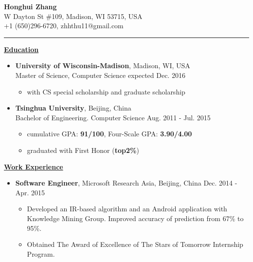 \documentclass[11pt]{article}
\begin{document}
\begin{CJK}{GBK}{kai}
\begin{center}
  {\textbf{\huge Honghui Zhang}}\\ W Dayton St \#109, Madison, WI 53715, USA\\
  +1 (650)296-6720, zhhthu11@gmail.com\\
\end{center}
\rule[4pt]{16.5cm}{0.5pt}
{ \textbf{\underline{Education}}}\\\medskip
\begin{itemize}
  \item \textbf{University of Wisconsin-Madison}, Madison, WI, USA\\
  Master of Science, Computer Science  \hfill expected Dec. 2016\\
    \begin{itemize}
    \item with CS special scholarship and graduate scholarship\\\medskip
    \end{itemize}
 \item \textbf{Tsinghua University}, Beijing, China\\
 Bachelor of Engineering. Computer Science \hfill Aug. 2011 - Jul. 2015\\
    \begin{itemize}
    \item cumulative GPA: \textbf{91/100}, Four-Scale GPA: \textbf{3.90/4.00}
    \item graduated with First Honor (\textbf{top2\%})
    \end{itemize}
\end{itemize}

\bigskip

{ \textbf{\underline{Work Experience}}}\\\medskip

\begin{itemize}
   \item \textbf{Software Engineer}, Microsoft Research Asia, Beijing, China \hfill Dec. 2014 - Apr. 2015\\
     \begin{itemize}
     \item Developed an IR-based algorithm and an Android application with Knowledge Mining Group. Improved accuracy of prediction from 67\% to 95\%.
     \item Obtained The Award of Excellence of The Stars of Tomorrow Internship Program.\\\medskip
     \end{itemize}


\end{itemize}
\end{CJK}
\end{document}
